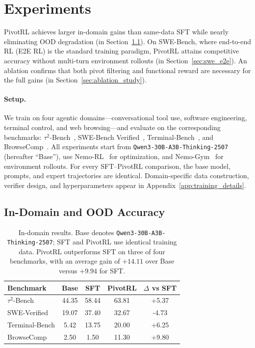 \section{Experiments}
\label{sec:experiments}

PivotRL achieves larger in-domain gains than same-data SFT while nearly eliminating OOD degradation (in Section~\ref{sec:indomain_ood_sft}). On SWE-Bench, where end-to-end RL (E2E RL) is the standard training paradigm, PivotRL attains competitive accuracy without multi-turn environment rollouts (in Section~\ref{sec:swe_e2e}). An ablation confirms that both pivot filtering and functional reward are necessary for the full gains (in Section~\ref{sec:ablation_study}).

\paragraph{Setup.}
We train on four agentic domains---conversational tool use, software engineering, terminal control, and web browsing---and evaluate on the corresponding benchmarks: $\tau^2$-Bench~\citep{barres2025tau2bench}, SWE-Bench Verified~\citep{jimenez2024swebench}, Terminal-Bench~\citep{tbench_2025}, and BrowseComp~\citep{wei2025browsecompsimplechallengingbenchmark}. All experiments start from \texttt{Qwen3-30B-A3B-Thinking-2507} (hereafter ``Base''), use Nemo-RL~\citep{nemo-rl} for optimization, and Nemo-Gym~\citep{nemo-gym} for environment rollouts. For every SFT--PivotRL comparison, the base model, prompts, and expert trajectories are identical. Domain-specific data construction, verifier design, and hyperparameters appear in Appendix~\ref{app:training_details}.

\subsection{In-Domain and OOD Accuracy}
\label{sec:indomain_ood_sft}

\begin{table}[t]
\centering
\small
\begin{tabular}{lcccc}
\toprule
\textbf{Benchmark} & \textbf{Base} & \textbf{SFT} & \textbf{PivotRL} & \textbf{$\Delta$ vs SFT} \\
\midrule
$\tau^2$-Bench   & 44.35 & 58.44 & 63.81 & +5.37 \\
SWE-Verified     & 19.07 & 37.40 & 32.67 & -4.73 \\
Terminal-Bench   & 5.42  & 13.75 & 20.00 & +6.25 \\
BrowseComp       & 2.50  & 1.50  & 11.30 & +9.80 \\
\bottomrule
\end{tabular}
\caption{
In-domain results. Base denotes \texttt{Qwen3-30B-A3B-Thinking-2507}; SFT and PivotRL use identical training data. PivotRL outperforms SFT on three of four benchmarks, with an average gain of $+14.11$ over Base versus $+9.94$ for SFT.
}
\label{tab:single_domain_main_results}
\end{table}


